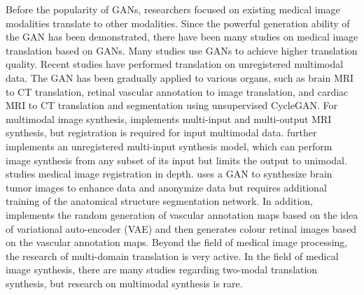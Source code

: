 \documentclass[runningheads]{llncs}
\begin{document}
Before the popularity of GANs, researchers focused on existing medical image modalities translate to other modalities\cite{22burgos2015robust,33huang2017simultaneous,34vemulapalli2015unsupervised,36vannguyen2015crossdomain}. Since the powerful generation ability of the GAN has been demonstrated, there have been many studies on medical image translation based on GANs\cite{2zhang2018translating,20nie2017medical,35osokin2017gans,36vannguyen2015crossdomain,40kamnitsas2017unsupervised}. Many studies use GANs to achieve higher translation quality\cite{1zhao2018modular,5liang2018generative,6zhu2017unpaired,13choi2018stargan:}. Recent studies have performed translation on unregistered multimodal data\cite{2zhang2018translating,85joyce2017robust}.
The GAN has been gradually applied to various organs, such as brain MRI to CT translation\cite{20nie2017medical,40kamnitsas2017unsupervised}, retinal vascular annotation to image translation\cite{41costa2017towards}, and cardiac MRI to CT translation and segmentation using unsupervised CycleGAN\cite{6zhu2017unpaired,20nie2017medical}.
For multimodal image synthesis, \cite{84chartsias2018multimodal} implements multi-input and multi-output MRI synthesis, but registration is required for input multimodal data. \cite{85joyce2017robust} further implements an unregistered multi-input synthesis model, which can perform image synthesis from any subset of its input but limits the output to unimodal. \cite{66Miao2018dilated} studies medical image registration in depth. \cite{4shin2018medical} uses a GAN to synthesize brain tumor images to enhance data and anonymize data but requires additional training of the anatomical structure segmentation network.
In addition, \cite{41costa2017towards} implements the random generation of vascular annotation maps based on the idea of variational auto-encoder (VAE)\cite{87kingma2014auto-encoding} and then generates colour retinal images based on the vascular annotation maps.
Beyond the field of medical image processing, the research of multi-domain translation is very active\cite{1zhao2018modular,5liang2018generative,13choi2018stargan:,27isola2017image-to-image}.
In the field of medical image synthesis, there are many studies regarding two-modal translation synthesis\cite{2zhang2018translating,20nie2017medical,22burgos2015robust,34vemulapalli2015unsupervised,35osokin2017gans,36vannguyen2015crossdomain,40kamnitsas2017unsupervised}, but research on multimodal synthesis is rare\cite{84chartsias2018multimodal,85joyce2017robust,4shin2018medical}.
\end{document}
